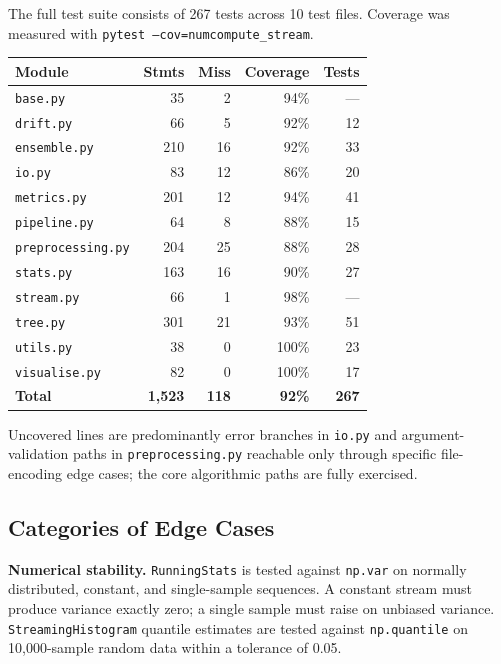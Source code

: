 \documentclass[10pt,a4paper]{article}
\begin{document}
The full test suite consists of 267 tests across 10 test files. Coverage was measured with \texttt{pytest --cov=numcompute\_stream}.

\begin{table}[h]
\centering
\footnotesize
\begin{tabular}{lrrrr}
\toprule
Module & Stmts & Miss & Coverage & Tests \\
\midrule
\texttt{base.py} & 35 & 2 & 94\% & --- \\
\texttt{drift.py} & 66 & 5 & 92\% & 12 \\
\texttt{ensemble.py} & 210 & 16 & 92\% & 33 \\
\texttt{io.py} & 83 & 12 & 86\% & 20 \\
\texttt{metrics.py} & 201 & 12 & 94\% & 41 \\
\texttt{pipeline.py} & 64 & 8 & 88\% & 15 \\
\texttt{preprocessing.py} & 204 & 25 & 88\% & 28 \\
\texttt{stats.py} & 163 & 16 & 90\% & 27 \\
\texttt{stream.py} & 66 & 1 & 98\% & --- \\
\texttt{tree.py} & 301 & 21 & 93\% & 51 \\
\texttt{utils.py} & 38 & 0 & 100\% & 23 \\
\texttt{visualise.py} & 82 & 0 & 100\% & 17 \\
\midrule
\textbf{Total} & \textbf{1{,}523} & \textbf{118} & \textbf{92\%} & \textbf{267} \\
\bottomrule
\end{tabular}
\end{table}

Uncovered lines are predominantly error branches in \texttt{io.py} and argument-validation paths in \texttt{preprocessing.py} reachable only through specific file-encoding edge cases; the core algorithmic paths are fully exercised.

\subsection{Categories of Edge Cases}

\textbf{Numerical stability.} \texttt{RunningStats} is tested against \texttt{np.var} on normally distributed, constant, and single-sample sequences. A constant stream must produce variance exactly zero; a single sample must raise on unbiased variance. \texttt{StreamingHistogram} quantile estimates are tested against \texttt{np.quantile} on 10{,}000-sample random data within a tolerance of 0.05.
\end{document}
